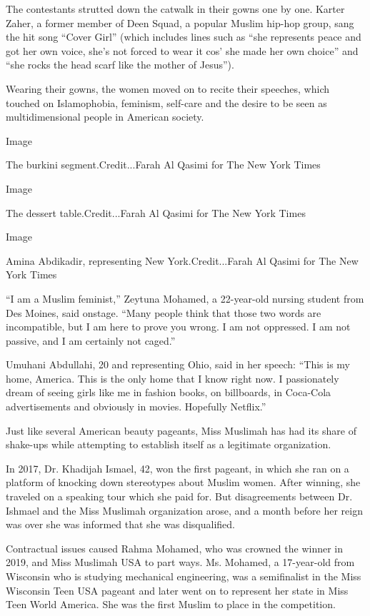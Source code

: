 The contestants strutted down the catwalk in their gowns one by one.
Karter Zaher, a former member of Deen Squad, a popular Muslim hip-hop
group, sang the hit song ``Cover Girl'' (which includes lines such as
``she represents peace and got her own voice, she's not forced to wear
it cos' she made her own choice'' and ``she rocks the head scarf like
the mother of Jesus'').

Wearing their gowns, the women moved on to recite their speeches, which
touched on Islamophobia, feminism, self-care and the desire to be seen
as multidimensional people in American society.

Image

The burkini segment.Credit...Farah Al Qasimi for The New York Times

Image

The dessert table.Credit...Farah Al Qasimi for The New York Times

Image

Amina Abdikadir, representing New York.Credit...Farah Al Qasimi for The
New York Times

``I am a Muslim feminist,'' Zeytuna Mohamed, a 22-year-old nursing
student from Des Moines, said onstage. ``Many people think that those
two words are incompatible, but I am here to prove you wrong. I am not
oppressed. I am not passive, and I am certainly not caged.''

Umuhani Abdullahi, 20 and representing Ohio, said in her speech: ``This
is my home, America. This is the only home that I know right now. I
passionately dream of seeing girls like me in fashion books, on
billboards, in Coca-Cola advertisements and obviously in movies.
Hopefully Netflix.''

Just like several American beauty pageants, Miss Muslimah has had its
share of shake-ups while attempting to establish itself as a legitimate
organization.

In 2017, Dr. Khadijah Ismael, 42, won the first pageant, in which she
ran on a platform of knocking down stereotypes about Muslim women. After
winning, she traveled on a speaking tour which she paid for. But
disagreements between Dr. Ishmael and the Miss Muslimah organization
arose, and a month before her reign was over she was informed that she
was disqualified.

Contractual issues caused Rahma Mohamed, who was crowned the winner in
2019, and Miss Muslimah USA to part ways. Ms. Mohamed, a 17-year-old
from Wisconsin who is studying mechanical engineering, was a
semifinalist in the Miss Wisconsin Teen USA pageant and later went on to
represent her state in Miss Teen World America. She was the first Muslim
to place in the competition.

